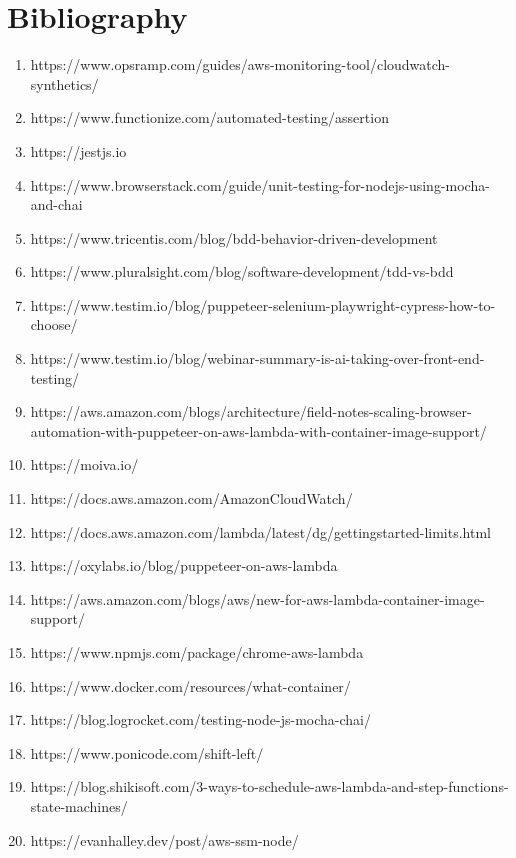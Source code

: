 \documentclass[12pt,a4paper,titlepage]{report}
\begin{document}
\chapter{Bibliography}
\begin{enumerate}
\item https://www.opsramp.com/guides/aws-monitoring-tool/cloudwatch-synthetics/
\item https://www.functionize.com/automated-testing/assertion
\item https://jestjs.io
\item https://www.browserstack.com/guide/unit-testing-for-nodejs-using-mocha-and-chai
\item https://www.tricentis.com/blog/bdd-behavior-driven-development
\item https://www.pluralsight.com/blog/software-development/tdd-vs-bdd
\item https://www.testim.io/blog/puppeteer-selenium-playwright-cypress-how-to-choose/
\item https://www.testim.io/blog/webinar-summary-is-ai-taking-over-front-end-testing/
\item https://aws.amazon.com/blogs/architecture/field-notes-scaling-browser-automation-with-puppeteer-on-aws-lambda-with-container-image-support/
\item https://moiva.io/
\item https://docs.aws.amazon.com/AmazonCloudWatch/
\item https://docs.aws.amazon.com/lambda/latest/dg/gettingstarted-limits.html
\item https://oxylabs.io/blog/puppeteer-on-aws-lambda
\item https://aws.amazon.com/blogs/aws/new-for-aws-lambda-container-image-support/
\item https://www.npmjs.com/package/chrome-aws-lambda
\item https://www.docker.com/resources/what-container/
\item https://blog.logrocket.com/testing-node-js-mocha-chai/
\item https://www.ponicode.com/shift-left/
\item https://blog.shikisoft.com/3-ways-to-schedule-aws-lambda-and-step-functions-state-machines/
\item https://evanhalley.dev/post/aws-ssm-node/
\end{enumerate}
\end{document}
